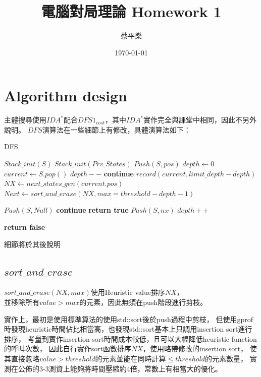 \documentclass[a4paper, 12pt]{article}  %
\title{電腦對局理論 Homework 1}
\author{蔡平樂}
\date{\today}
\begin{document}
\maketitle

\section{Algorithm design}


主體搜尋使用$IDA^*$配合$DFS1_{cost}$，其中$IDA^*$實作完全與課堂中相同，因此不另外說明。
$DFS$演算法在一些細節上有修改，具體演算法如下：
\begin{algorithm}[!h]
    \caption{DFS}
    \label{DFS}
\begin{algorithmic}[1]
        \State$Stack\_init(S)$
        \State$Stack\_init(Prv\_States)$
        \State$Push(S, pos)$
        \State$depth \gets 0$
            \State$current\gets S.pop()$
                \State$depth--$
                \State\textbf{continue}
            \EndIf
            \State$record(current, limit\_depth - depth)$
            \State$NX \gets next\_states\_gen(current.pos)$
            \State$Next \gets sort\_and\_erase(NX, max = threshold - depth - 1)$
            
            \State$Push(S, Null)$
                 \textbf{continue}
                \EndIf
                 \textbf{return true}
                \EndIf
                \State$Push(S, nx)$
            \EndFor
            \State$depth++$

        \EndWhile
        \State\textbf{return false}
    \EndProcedure
\end{algorithmic}
\end{algorithm}

細節將於其後說明

\subsection{$sort\_and\_erase$}
$sort\_and\_erase(NX, max)$使用Heuristic value排序$NX$，\\
並移除所有$value > max$的元素，因此無須在push階段進行剪枝。


實作上，最初是使用標準算法的使用std::sort後於push過程中剪枝，
但使用gprof時發現heuristic時間佔比相當高，也發現std::sort基本上只調用insertion sort進行排序，
考量到實作insertion sort時間成本較低，且可以大幅降低heuristic function的呼叫次數，
因此自行實作sort函數排序$NX$，使用略帶修改的insertion sort，
使其直接忽略$value > threshold$的元素並能在同時計算$\le threshold$的元素數量，
實測在公佈的3-3測資上能夠將時間壓縮約4倍，常數上有相當大的優化。
\end{document}
